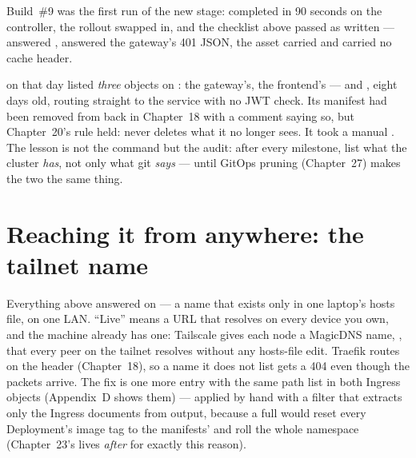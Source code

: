 Build~\#9 was the first run of the new stage: 
completed in 90 seconds on the controller, the rollout swapped
 in, and the checklist above passed as written
---  answered , 
answered the gateway's 401 JSON, the asset carried
 and \code{/} carried no cache header.

\begin{pitfall}
 on that day listed \emph{three} objects on
: the gateway's, the frontend's --- and
, eight days old, routing 
straight to the service with no JWT check. Its manifest had been
removed from  back in Chapter~18 with a
comment saying so, but Chapter~20's rule held:  never
deletes what it no longer sees. It took a manual
. The lesson is not
the command but the audit: after every milestone, list what the
cluster \emph{has}, not only what git \emph{says} --- until GitOps
pruning (Chapter~27) makes the two the same thing.
\end{pitfall}

\section{Reaching it from anywhere: the tailnet name}

Everything above answered on  --- a name that exists
only in one laptop's hosts file, on one LAN. ``Live'' means a URL that
resolves on every device you own, and the machine already has one:
Tailscale gives each node a MagicDNS name,
, that every peer on the tailnet
resolves without any hosts-file edit. Traefik routes on the
 header (Chapter~18), so a name it does not list gets a
404 even though the packets arrive. The fix is one more 
entry with the same path list in both Ingress objects
(Appendix~D shows them) --- applied by hand with a filter that
extracts only the Ingress documents from 
output, because a full  would reset every
Deployment's image tag to the manifests'  and
roll the whole namespace (Chapter~23's  lives
\emph{after}  for exactly this reason).

